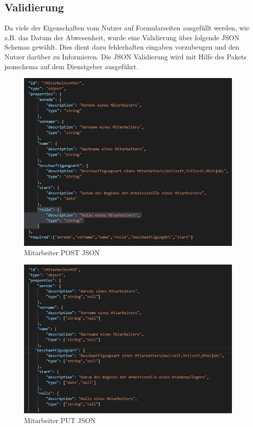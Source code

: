 \documentclass[11pt,
paper=a4,
bibtotocnumbered,	  %
liststotocnumbered,  %
DIV=calc,		  %
tablecaptionabove,	  %
headinclude,
]{article}
\begin{document}
\subsection{Validierung}
Da viele der Eigenschaften vom Nutzer auf Formularseiten ausgefüllt werden, wie z.B. das Datum der Abwesenheit, wurde eine Validierung über folgende JSON Schemas gewählt. Dies dient dazu fehlerhaften eingaben vorzubeugen und den Nutzer darüber zu Informieren.
Die JSON Validierung wird mit Hilfe des Pakets jsonschema auf dem Dienstgeber ausgeführt.
\begin{figure}[H]
\includegraphics[width=1\textwidth]{Bilder/validMitarbeiterPost.jpg}
\caption{Mitarbeiter POST JSON}
\end{figure}
\begin{figure}[H]
\includegraphics[width=1\textwidth]{Bilder/validMitarbeiterPut.jpg}
\caption{Mitarbeiter PUT JSON}
\end{figure}
\end{document}
